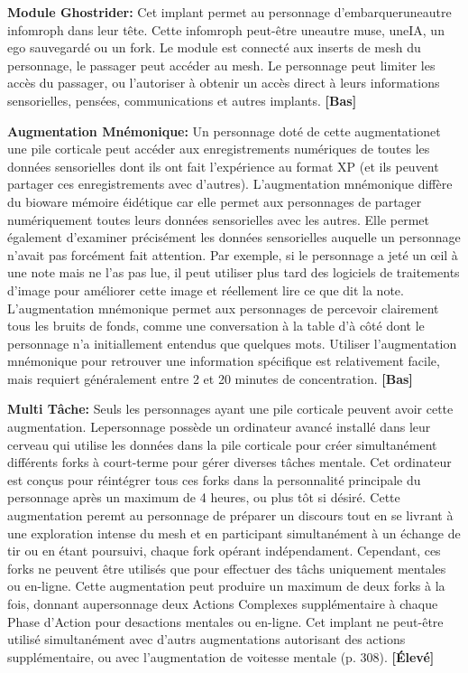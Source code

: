 {{\textbf{Module Ghostrider:} Cet implant permet au personnage d'embarqueruneautre infomroph dans leur tête. Cette infomroph peut-être uneautre muse, uneIA, un ego sauvegardé ou un fork. Le module est connecté aux inserts de mesh du personnage, le passager peut accéder au mesh. Le personnage peut limiter les accès du passager, ou l'autoriser à obtenir un accès direct à leurs informations sensorielles, pensées, communications et autres implants. \textbf{[Bas]} 

\textbf{Augmentation Mnémonique:} Un personnage doté de cette augmentationet une pile corticale peut accéder aux enregistrements numériques de toutes les données sensorielles dont ils ont fait l'expérience au format XP (et ils peuvent partager ces enregistrements avec d'autres). L'augmentation mnémonique diffère du bioware mémoire éidétique car elle permet aux personnages de partager numériquement toutes leurs données sensorielles avec les autres. Elle permet également d'examiner précisément les données sensorielles auquelle un personnage n'avait pas forcément fait attention. Par exemple, si le personnage a jeté un œil à une note mais ne l'as pas lue, il peut utiliser plus tard des logiciels de traitements d'image pour améliorer cette image et réellement lire ce que dit la note. L'augmentation mnémonique permet aux personnages de percevoir clairement tous les bruits de fonds, comme une conversation à la table d'à côté dont le personnage n'a initiallement entendus que quelques mots. Utiliser l'augmentation mnémonique pour retrouver une information spécifique est relativement facile, mais requiert généralement entre 2 et 20 minutes de concentration. \textbf{[Bas]} 

\textbf{Multi Tâche:} Seuls les personnages ayant une pile corticale peuvent avoir cette augmentation. Lepersonnage possède un ordinateur avancé installé dans leur cerveau qui utilise les données dans la pile corticale pour créer simultanément différents forks à court-terme pour gérer diverses tâches mentale. Cet ordinateur est conçus pour réintégrer tous ces forks dans la personnalité principale du personnage après un maximum de 4 heures, ou plus tôt si désiré. Cette augmentation peremt au personnage de préparer un discours tout en se livrant à une exploration intense du mesh et en participant simultanément à un échange de tir ou en étant poursuivi, chaque fork opérant indépendament. Cependant, ces forks ne peuvent être utilisés que pour effectuer des tâchs uniquement mentales ou en-ligne. Cette augmentation peut produire un maximum de deux forks à la fois, donnant aupersonnage deux Actions Complexes supplémentaire à chaque Phase d'Action pour desactions mentales ou en-ligne. Cet implant ne peut-être utilisé simultanément avec d'autrs augmentations autorisant des actions supplémentaire, ou avec l'augmentation de voitesse mentale (p. 308). \textbf{[Élevé]} 

}}

